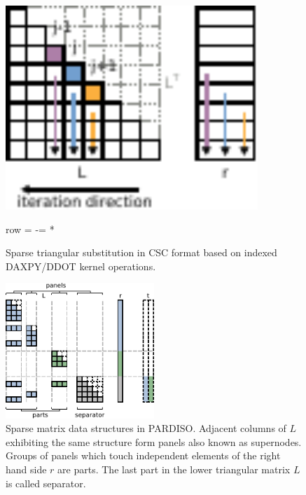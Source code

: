 \begin{figure}[t]
    \centering
    \begin{minipage}{.35\textwidth}
        \centering
        \includegraphics[width=0.85\textwidth,clip=true]{images/backward-small}
    \end{minipage}%
    \begin{minipage}{0.65\textwidth}
        \centering
  \begin{algorithmic}[1]
            \label{algo:bw:cholmod}
                   \State row = \nindx[i]
                   \State \nr[j] -=  \nr[row] * \nlnz[i] 
            \EndFor\label{algo:bw:cholmod:rloop:end}
      \EndFor
    \EndProcedure
  \end{algorithmic}
    \end{minipage}
  \caption{Sparse triangular substitution in CSC format based on indexed DAXPY/DDOT kernel operations.}
  \label{algo:triangular}
\end{figure}


\begin{figure}[t]
  \centering
    \includegraphics[width=0.5\textwidth,clip=true]{images/parts-panels-separator}
  \caption{Sparse matrix data structures in PARDISO. Adjacent columns of $L$ exhibiting the same
structure form panels also known as supernodes. 
Groups of panels which touch independent elements of the right hand side $r$ are
parts. The last part in the lower triangular matrix $L$ is called separator.}
  \label{fig:algo:ds}
\end{figure}


